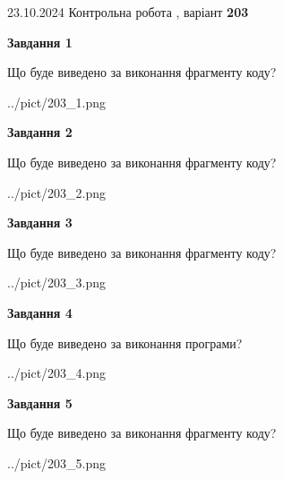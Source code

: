 \documentclass[12pt, ukrainian]{article}
\begin{document}
{\Large{23.10.2024 Контрольна робота , варіант  \No \textbf { 203 }\par}}
{
\begin {large}
{\begin {center}\textbf{Завдання 1}\end {center}}

Що буде виведено за виконання фрагменту коду?\par
\begin{center}
	{../pict/203_1.png}
\end{center}
\newpage

{\begin {center}\textbf{Завдання 2}\end {center}}

Що буде виведено за виконання фрагменту коду?\par
\begin{center}
	{../pict/203_2.png}
\end{center}
\newpage

{\begin {center}\textbf{Завдання 3}\end {center}}

Що буде виведено за виконання фрагменту коду?\par
\begin{center}
	{../pict/203_3.png}
\end{center}
\newpage

{\begin {center}\textbf{Завдання 4}\end {center}}

Що буде виведено за виконання програми?\par
\begin{center}
	{../pict/203_4.png}
\end{center}
\newpage

{\begin {center}\textbf{Завдання 5}\end {center}}

Що буде виведено за виконання фрагменту коду?\par
\begin{center}
	{../pict/203_5.png}
\end{center}
\newpage


\end{large}}
\end{document}

